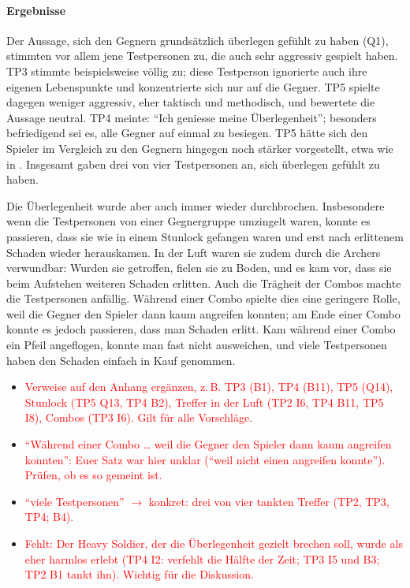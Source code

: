 \documentclass[../Main.tex]{subfiles}
\begin{document}
\paragraph{Ergebnisse}
Der Aussage, sich den Gegnern grundsätzlich überlegen gefühlt zu haben (Q1), stimmten vor allem jene Testpersonen zu, die auch sehr aggressiv gespielt haben. TP3 stimmte beispielsweise völlig zu; diese Testperson ignorierte auch ihre eigenen Lebenspunkte und konzentrierte sich nur auf die Gegner. TP5 spielte dagegen weniger aggressiv, eher taktisch und methodisch, und bewertete die Aussage neutral. TP4 meinte: \enquote{Ich geniesse meine Überlegenheit}; besonders befriedigend sei es, alle Gegner auf einmal zu besiegen. TP5 hätte sich den Spieler im Vergleich zu den Gegnern hingegen noch stärker vorgestellt, etwa wie in . Insgesamt gaben drei von vier Testpersonen an, sich überlegen gefühlt zu haben.

Die Überlegenheit wurde aber auch immer wieder durchbrochen. Insbesondere wenn die Testpersonen von einer Gegnergruppe umzingelt waren, konnte es passieren, dass sie wie in einem Stunlock gefangen waren und erst nach erlittenem Schaden wieder herauskamen. In der Luft waren sie zudem durch die Archers verwundbar: Wurden sie getroffen, fielen sie zu Boden, und es kam vor, dass sie beim Aufstehen weiteren Schaden erlitten. Auch die Trägheit der Combos machte die Testpersonen anfällig. Während einer Combo spielte dies eine geringere Rolle, weil die Gegner den Spieler dann kaum angreifen konnten; am Ende einer Combo konnte es jedoch passieren, dass man Schaden erlitt. Kam während einer Combo ein Pfeil angeflogen, konnte man fast nicht ausweichen, und viele Testpersonen haben den Schaden einfach in Kauf genommen.

\begin{itemize}[leftmargin=1.5cm]
    \item \textcolor{red}{Verweise auf den Anhang ergänzen, z.\,B. TP3 (B1), TP4 (B11), TP5 (Q14), Stunlock (TP5 Q13, TP4 B2), Treffer in der Luft (TP2 I6, TP4 B11, TP5 I8), Combos (TP3 I6). Gilt für alle Vorschläge.}
    \item \textcolor{red}{\enquote{Während einer Combo \ldots{} weil die Gegner den Spieler dann kaum angreifen konnten}: Euer Satz war hier unklar (\enquote{weil nicht einen angreifen konnte}). Prüfen, ob es so gemeint ist.}
    \item \textcolor{red}{\enquote{viele Testpersonen} $\rightarrow$ konkret: drei von vier tankten Treffer (TP2, TP3, TP4; B4).}
    \item \textcolor{red}{Fehlt: Der Heavy Soldier, der die Überlegenheit gezielt brechen soll, wurde als eher harmlos erlebt (TP4 I2: verfehlt die Hälfte der Zeit; TP3 I5 und B3; TP2 B1 tankt ihn). Wichtig für die Diskussion.}
\end{itemize}
\end{document}
